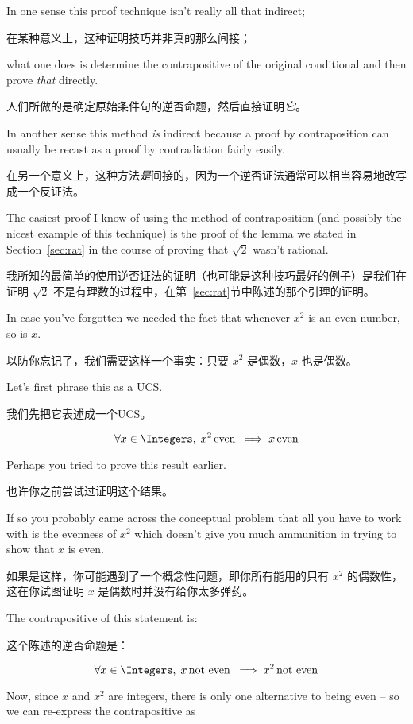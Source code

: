 In one sense this proof technique isn't really all that
indirect;

在某种意义上，这种证明技巧并非真的那么间接；

what one does is determine the contrapositive of the original
conditional and then prove {\em that} directly.

人们所做的是确定原始条件句的逆否命题，然后直接证明{\em 它}。

In another sense this 
method {\em is} indirect because a proof by contraposition can usually
be recast as a proof by contradiction fairly easily.

在另一个意义上，这种方法{\em 是}间接的，因为一个逆否证法通常可以相当容易地改写成一个反证法。

The easiest proof I know of using the method of contraposition (and possibly
the nicest example of this technique)
is the proof of the lemma we stated in Section~\ref{sec:rat} in the course
of proving that $\sqrt{2}$ wasn't rational.

我所知的最简单的使用逆否证法的证明（也可能是这种技巧最好的例子）是我们在证明 $\sqrt{2}$ 不是有理数的过程中，在第~\ref{sec:rat}节中陈述的那个引理的证明。

In case you've forgotten
we needed the fact that whenever $x^2$ is an even number, so is $x$.

以防你忘记了，我们需要这样一个事实：只要 $x^2$ 是偶数，$x$ 也是偶数。

Let's first phrase this as a UCS.

我们先把它表述成一个UCS。

\[ \forall x \in \Integers, \; x^2 \, \mbox{even} \; \implies x \, \mbox{even} 
\]

Perhaps you tried to prove this result earlier.

也许你之前尝试过证明这个结果。

If so you probably
came across the conceptual problem that all you have to work with
is the evenness of $x^2$ which doesn't give you much ammunition
in trying to show that $x$ is even.

如果是这样，你可能遇到了一个概念性问题，即你所有能用的只有 $x^2$ 的偶数性，这在你试图证明 $x$ 是偶数时并没有给你太多弹药。

The contrapositive of this 
statement is:

这个陈述的逆否命题是：

\[ \forall x \in \Integers, \; x \, \mbox{not even} \; \implies x^2 \, \mbox{not even} 
\]
 
Now, since $x$ and $x^2$ are integers, there is only one alternative to being
even -- so we can re-express the contrapositive as

